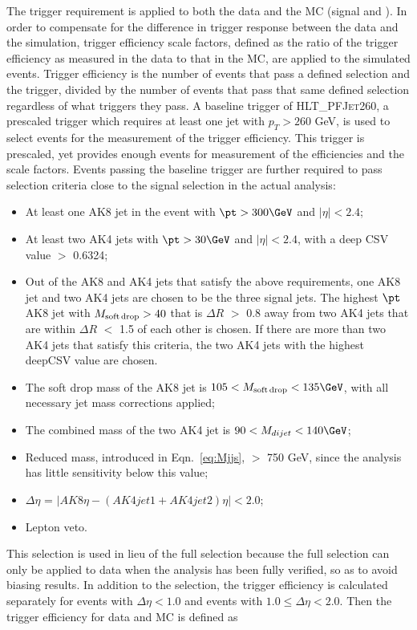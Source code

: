 The trigger requirement is applied to both the data and the MC (signal and \ttbar). In order to compensate for the difference in trigger response between the data and the simulation, trigger efficiency scale factors, defined as the ratio of the trigger efficiency as measured in the data to that in the MC, are applied to the simulated events. Trigger efficiency is the number of events that pass a defined selection and the trigger, divided by the number of events that pass that same defined selection regardless of what triggers they pass. A baseline trigger of \textsc{HLT\_PFJet260}, a prescaled trigger which requires at least one jet with $ p_{T} > 260$ GeV, is used to select events for the measurement of the trigger efficiency. This trigger is prescaled, yet provides enough events for measurement of the efficiencies and the scale factors. Events passing the baseline trigger are further required to pass selection criteria close to the signal selection in the actual analysis:
\begin{itemize}
 \item At least one AK8 jet in the event with $\pt > 300\GeV$ and $|\eta| < 2.4$;
 \item At least two AK4 jets with $\pt > 30\GeV$ and $|\eta| < 2.4$, with a deep CSV value $>$ 0.6324;
 \item Out of the AK8 and AK4 jets that satisfy the above requirements, one AK8 jet and two AK4 jets are chosen to be the three signal jets. The highest $\pt$ AK8 jet with $M_{\rm soft\,drop} > 40$ \GeV that is $\Delta R$ $>$ 0.8 away from two AK4 jets that are within $\Delta R$ $<$ 1.5 of each other is chosen. If there are more than two AK4 jets that satisfy this criteria, the two AK4 jets with the highest deepCSV value are chosen.
 \item The soft drop mass of the AK8 jet is $105 < M_{\rm soft\,drop} < 135\GeV$, with all necessary jet mass corrections applied;
 \item The combined mass of the two AK4 jet is $90 < M_{dijet} < 140\GeV$;
 \item Reduced mass, introduced in Eqn.~\ref{eq:Mjjs}, $>$ 750 GeV, since the analysis has little sensitivity below this value;
 \item $\Delta\eta$ = $|AK8\eta - (AK4jet1 + AK4jet2)\eta| < 2.0$;
 \item Lepton veto.
\end{itemize}
This selection is used in lieu of the full selection because the full selection can only be applied to data when the analysis has been fully verified, so as to avoid biasing results. In addition to the selection, the trigger efficiency is calculated separately for events with $\Delta\eta < 1.0$ and events with $1.0 \leq \Delta\eta < 2.0$. Then the trigger efficiency for data and MC is defined as 
